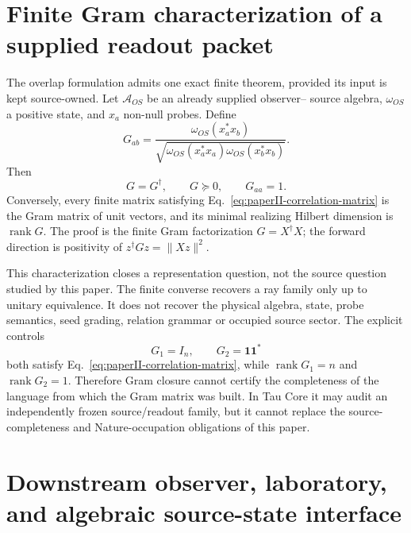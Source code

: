 \documentclass[11pt]{article}
\begin{document}
\section{Finite Gram characterization of a supplied readout packet}

The overlap formulation admits one exact finite theorem, provided its input
is kept source-owned.  Let $\mathcal A_{OS}$ be an already supplied observer--
source algebra, $\omega_{OS}$ a positive state, and $x_a$ non-null probes.
Define
\begin{equation}
 G_{ab}=
 \frac{\omega_{OS}(x_a^*x_b)}
 {\sqrt{\omega_{OS}(x_a^*x_a)\omega_{OS}(x_b^*x_b)}}.
 \label{eq:paperII-gns-gram}
\end{equation}
Then
\begin{equation}
 G=G^\dagger,\qquad G\succeq0,\qquad G_{aa}=1.
 \label{eq:paperII-correlation-matrix}
\end{equation}
Conversely, every finite matrix satisfying
Eq.~\eqref{eq:paperII-correlation-matrix} is the Gram matrix of unit vectors,
and its minimal realizing Hilbert dimension is $\operatorname{rank}G$.  The
proof is the finite Gram factorization $G=X^\dagger X$; the forward direction
is positivity of $z^\dagger Gz=\|Xz\|^2$.

This characterization closes a representation question, not the source
question studied by this paper.  The finite converse recovers a ray family
only up to unitary equivalence.  It does not recover the physical algebra,
state, probe semantics, seed grading, relation grammar or occupied source
sector.  The explicit controls
\begin{equation}
 G_1=I_n,
 \qquad
 G_2=\mathbf1\mathbf1^*
 \label{eq:paperII-gram-counterpair}
\end{equation}
both satisfy Eq.~\eqref{eq:paperII-correlation-matrix}, while
$\operatorname{rank}G_1=n$ and $\operatorname{rank}G_2=1$.  Therefore Gram
closure cannot certify the completeness of the language from which the Gram
matrix was built.  In Tau Core it may audit an independently frozen
source/readout family, but it cannot replace the source-completeness and
Nature-occupation obligations of this paper.

\section{Downstream observer, laboratory, and algebraic source-state interface}
\label{sec:downstream-interface-paperii}

\end{document}
